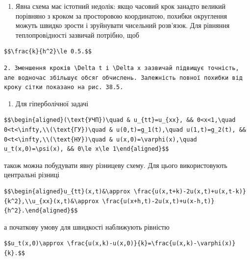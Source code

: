 \documentclass[
  ukrainian,
]{article}
\providecommand{\tightlist}{%
  \setlength{\itemsep}{0pt}\setlength{\parskip}{0pt}}
\begin{document}
\begin{enumerate}
\def\labelenumi{\arabic{enumi}.}
\tightlist
\item
  Явна схема має істотний недолік: якщо часовий крок занадто великий
  порівняно з кроком за просторовою координатою, похибки округлення
  можуть швидко зрости і зруйнувати чисельний розв'язок. Для рівняння
  теплопровідності зазвичай потрібно, щоб
\end{enumerate}

\begin{verbatim}
$$\frac{k}{h^2}\le 0.5.$$
\end{verbatim}

\begin{verbatim}
2. Зменшення кроків \Delta t і \Delta x зазвичай підвищує точність, але водночас збільшує обсяг обчислень. Залежність повної похибки від кроку сітки показано на рис. 38.5.
\end{verbatim}

\begin{enumerate}
\def\labelenumi{\arabic{enumi}.}
\setcounter{enumi}{2}
\tightlist
\item
  Для гіперболічної задачі
\end{enumerate}

\begin{verbatim}
$$\begin{aligned}(\text{УЧП})\quad & u_{tt}=u_{xx}, && 0<x<1,\quad 0<t<\infty,\\(\text{ГУ})\quad & u(0,t)=g_1(t),\quad u(1,t)=g_2(t), && 0<t<\infty,\\(\text{НУ})\quad & u(x,0)=\varphi(x),\quad u_t(x,0)=\psi(x), && 0\le x\le 1\end{aligned}$$
\end{verbatim}

також можна побудувати явну різницеву схему. Для цього використовують
центральні різниці

\begin{verbatim}
$$\begin{aligned}u_{tt}(x,t)&\approx \frac{u(x,t+k)-2u(x,t)+u(x,t-k)}{k^2},\\u_{xx}(x,t)&\approx \frac{u(x+h,t)-2u(x,t)+u(x-h,t)}{h^2}.\end{aligned}$$
\end{verbatim}

а початкову умову для швидкості наближують рівністю

\begin{verbatim}
$$u_t(x,0)\approx \frac{u(x,k)-u(x,0)}{k}=\frac{u(x,k)-\varphi(x)}{k}.$$
\end{verbatim}
\end{document}
